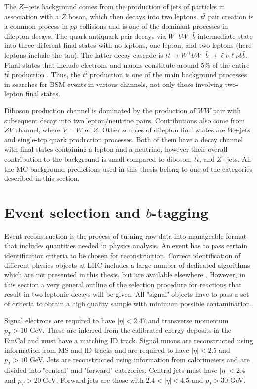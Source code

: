 The $Z$+jets background comes from the production of jets of particles in association with a $Z$ boson, which then decays into two leptons. $t\bar{t}$ pair creation is a common process in $pp$ collisions and is one of the dominant processes in dilepton decays. The quark-antiquark pair decays via $W^+bW^-\bar{b}$ intermediate state into three different final states with no leptons, one lepton, and two leptons (here leptons include the tau). The latter decay cascade is $t\bar{t} \to W^+bW^-\bar{b} \to \ell \nu \ell \nu b \bar{b}$. Final states that include electrons and muons constitute around 5\% of the entire $t\bar{t}$ production \citep{Wagner:2010wd}. Thus, the $t\bar{t}$ production is one of the main background processes in searches for BSM events in various channels, not only those involving two-lepton final states. 

Diboson production channel is dominated by the production of $WW$ pair with subsequent decay into two lepton/neutrino pairs. Contributions also come from $ZV$ channel, where $V = W$ or $Z$.
Other sources of dilepton final states are $W$+jets and single-top quark production processes. Both of them have a decay channel with final states containing a lepton and a neutrino, however their overall contribution to the background is small compared to diboson, $t\bar{t}$, and $Z$+jets. 
All the MC background predictions used in this thesis belong to one of the categories described in this section. 




\section{Event selection and $b$-tagging}

Event reconstruction is the process of turning raw data into manageable format that includes quantities needed in physics analysis. An event has to pass certain identification criteria to be chosen for reconstruction. Correct identification of different physics objects at LHC includes a large number of dedicated algorithms which are not presented in this thesis, but are available elsewhere \citep{Aad:2016tuk}. 
However, in this section a very general outline of the selection procedure for reactions that result in two leptonic decays will be given. All "signal" objects have to pass a set of criteria to obtain a high quality sample with minimum possible contamination.

Signal electrons are required to have $|\eta|<2.47$ and transverse momentum $p_{T}>10$ GeV. These are inferred from the calibrated  energy deposits in the EmCal and must have a matching ID track. Signal muons are reconstructed using information from MS and ID tracks and are required to have   $|\eta|<2.5$ and $p_{T}>10$ GeV. Jets are reconstructed using information from calorimeters and are divided into "central" and "forward" categories. Central jets must have $|\eta|<2.4$ and $p_{T}>20$ GeV. Forward jets are those with $2.4<|\eta|<4.5$ and $p_{T}>30$ GeV. 


